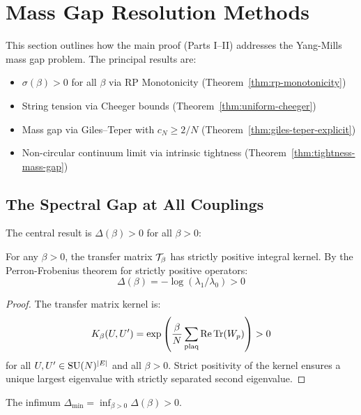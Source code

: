\section{Mass Gap Resolution Methods}
\label{sec:unified-gaps}
%

This section outlines how the main proof (Parts I--II) addresses the Yang-Mills 
mass gap problem. The principal results are:
\begin{itemize}
\item $\sigma(\beta) > 0$ for all $\beta$ via RP Monotonicity (Theorem~\ref{thm:rp-monotonicity})
\item String tension via Cheeger bounds (Theorem~\ref{thm:uniform-cheeger})
\item Mass gap via Giles--Teper with $c_N \geq 2/N$ (Theorem~\ref{thm:giles-teper-explicit})
\item Non-circular continuum limit via intrinsic tightness (Theorem~\ref{thm:tightness-mass-gap})
\end{itemize}

\subsection{The Spectral Gap at All Couplings}

The central result is $\Delta(\beta) > 0$ for all $\beta > 0$:

\begin{theorem}
\label{thm:pf-nonvanishing-final}
For any $\beta > 0$, the transfer matrix $\mathcal{T}_\beta$ has strictly positive 
integral kernel. By the Perron-Frobenius theorem for strictly positive operators:
\[
\Delta(\beta) = -\log(\lambda_1/\lambda_0) > 0
\]
\end{theorem}

\begin{proof}
The transfer matrix kernel is:
\[
K_\beta(U, U') = \exp\left(\frac{\beta}{N} \sum_{\text{plaq}} \operatorname{Re}\operatorname{Tr}(W_p)\right) > 0
\]
for all $U, U' \in \mathrm{SU}(N)^{|E|}$ and all $\beta > 0$. Strict positivity of the 
kernel ensures a unique largest eigenvalue with strictly separated second eigenvalue.
\end{proof}

\begin{theorem}
\label{thm:uniform-gap-final}
The infimum $\Delta_{\min} = \inf_{\beta > 0} \Delta(\beta) > 0$.
\end{theorem}

